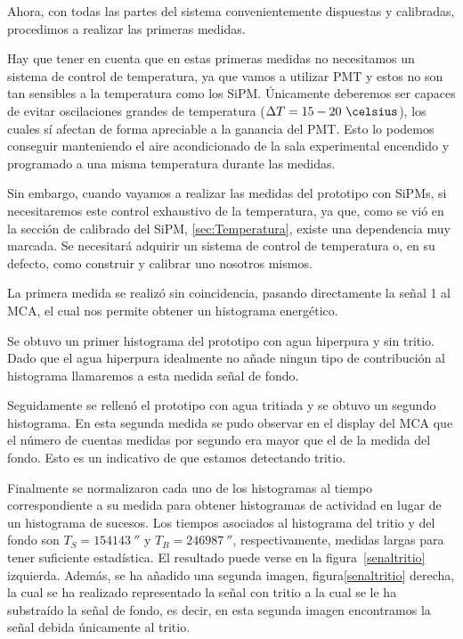Ahora, con todas las partes del sistema convenientemente dispuestas y calibradas, procedimos a realizar las primeras medidas.

Hay que tener en cuenta que en estas primeras medidas no necesitamos un sistema de control de temperatura, ya que vamos a utilizar PMT y estos no son tan sensibles a la temperatura como los SiPM. Únicamente deberemos ser capaces de evitar oscilaciones grandes de temperatura ($\Delta T=15-20~\celsius$), los cuales sí afectan de forma apreciable a la ganancia del PMT. Esto lo podemos conseguir manteniendo el aire acondicionado de la sala experimental encendido y programado a una misma temperatura durante las medidas. 

Sin embargo, cuando vayamos a realizar las medidas del prototipo con SiPMs, si necesitaremos este control exhaustivo de la temperatura, ya que, como se vió en la sección de calibrado del SiPM, \ref{sec:Temperatura}, existe una dependencia muy marcada. Se necesitará adquirir un sistema de control de temperatura o, en su defecto, como construir y calibrar uno nosotros mismos.

La primera medida se realizó sin coincidencia, pasando directamente la señal 1 al MCA, el cual nos permite obtener un histograma energético.

Se obtuvo un primer histograma del prototipo con agua hiperpura y sin tritio. Dado que el agua hiperpura idealmente no añade ningun tipo de contribución al histograma llamaremos a esta medida señal de fondo. 

Seguidamente se rellenó el prototipo con agua tritiada y se obtuvo un segundo histograma. En esta segunda medida se pudo observar en el display del MCA que el número de cuentas medidas por segundo era mayor que el de la medida del fondo. Esto es un indicativo de que estamos detectando tritio. 

Finalmente se normalizaron cada uno de los histogramas al tiempo correspondiente a su medida para obtener histogramas de actividad en lugar de un histograma de sucesos. Los tiempos asociados al histograma del tritio y del fondo son $T_S=154143~\second$  y $T_B=246987~\second$, respectivamente, medidas largas para tener suficiente estadística. El resultado puede verse en la figura~\ref{senaltritio} izquierda. Además, se ha añadido una segunda imagen, figura\ref{senaltritio} derecha,  la cual se ha realizado representado la señal con tritio a la cual se le ha substraído la señal de fondo, es decir, en esta segunda imagen encontramos la señal debida únicamente al tritio.

